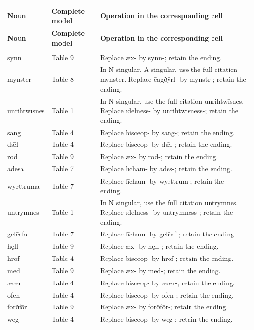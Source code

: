 \par\addvspace{5pt}
\par\endgroup

\par\begingroup
\fontsize{10.5}{13.2}\selectfont
\setlength{\LTleft}{0pt}\setlength{\LTright}{\fill}
\begin{longtable}{@{}>{\raggedright\arraybackslash}p{25mm}>{\raggedright\arraybackslash}p{19mm}>{\raggedright\arraybackslash}p{74.37mm}@{}}
\toprule
\textbf{Noun} & \textbf{Complete model} & \textbf{Operation in the corresponding cell} \\
\midrule
\endfirsthead
\toprule
\textbf{Noun} & \textbf{Complete model} & \textbf{Operation in the corresponding cell} \\
\midrule
\endhead
\midrule
\multicolumn{3}{r}{\footnotesize Continued on the following page.}\\
\endfoot
\bottomrule
\endlastfoot
synn & Table 9 & Replace æx- by synn-; retain the ending. \\
mynster & Table 8 & In N singular, A singular, use the full citation mynster. Replace ēagðȳrl- by mynstr-; retain the ending. \\
unrihtwīsnes & Table 1 & In N singular, use the full citation unrihtwīsnes. Replace īdelness- by unrihtwīsness-; retain the ending. \\
sang & Table 4 & Replace bisceop- by sang-; retain the ending. \\
dǣl & Table 4 & Replace bisceop- by dǣl-; retain the ending. \\
rōd & Table 9 & Replace æx- by rōd-; retain the ending. \\
adesa & Table 7 & Replace līcham- by ades-; retain the ending. \\
wyrttruma & Table 7 & Replace līcham- by wyrttrum-; retain the ending. \\
untrymnes & Table 1 & In N singular, use the full citation untrymnes. Replace īdelness- by untrymness-; retain the ending. \\
gelēafa & Table 7 & Replace līcham- by gelēaf-; retain the ending. \\
hęll & Table 9 & Replace æx- by hęll-; retain the ending. \\
hrōf & Table 4 & Replace bisceop- by hrōf-; retain the ending. \\
mēd & Table 9 & Replace æx- by mēd-; retain the ending. \\
æcer & Table 4 & Replace bisceop- by æcer-; retain the ending. \\
ofen & Table 4 & Replace bisceop- by ofen-; retain the ending. \\
forðfōr & Table 9 & Replace æx- by forðfōr-; retain the ending. \\
weg & Table 4 & Replace bisceop- by weg-; retain the ending. \\
\end{longtable}
\par\endgroup

